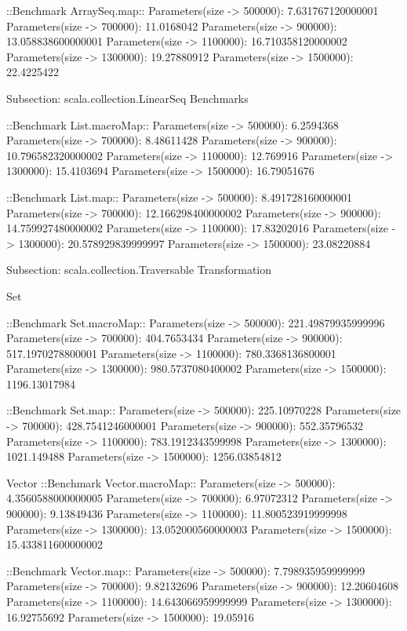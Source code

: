 ::Benchmark ArraySeq.map::
Parameters(size -> 500000): 7.631767120000001
Parameters(size -> 700000): 11.0168042
Parameters(size -> 900000): 13.058838600000001
Parameters(size -> 1100000): 16.710358120000002
Parameters(size -> 1300000): 19.27880912
Parameters(size -> 1500000): 22.4225422


Subsection: scala.collection.LinearSeq Benchmarks

::Benchmark List.macroMap::
Parameters(size -> 500000): 6.2594368
Parameters(size -> 700000): 8.48611428
Parameters(size -> 900000): 10.796582320000002
Parameters(size -> 1100000): 12.769916
Parameters(size -> 1300000): 15.4103694
Parameters(size -> 1500000): 16.79051676

::Benchmark List.map::
Parameters(size -> 500000): 8.491728160000001
Parameters(size -> 700000): 12.166298400000002
Parameters(size -> 900000): 14.759927480000002
Parameters(size -> 1100000): 17.83202016
Parameters(size -> 1300000): 20.578929839999997
Parameters(size -> 1500000): 23.08220884


Subsection: scala.collection.Traversable Transformation

Set

::Benchmark Set.macroMap::
Parameters(size -> 500000): 221.49879935999996
Parameters(size -> 700000): 404.7653434
Parameters(size -> 900000): 517.1970278800001
Parameters(size -> 1100000): 780.3368136800001
Parameters(size -> 1300000): 980.5737080400002
Parameters(size -> 1500000): 1196.13017984

::Benchmark Set.map::
Parameters(size -> 500000): 225.10970228
Parameters(size -> 700000): 428.7541246000001
Parameters(size -> 900000): 552.35796532
Parameters(size -> 1100000): 783.1912343599998
Parameters(size -> 1300000): 1021.149488
Parameters(size -> 1500000): 1256.03854812


Vector
::Benchmark Vector.macroMap::
Parameters(size -> 500000): 4.3560588000000005
Parameters(size -> 700000): 6.97072312
Parameters(size -> 900000): 9.13849436
Parameters(size -> 1100000): 11.800523919999998
Parameters(size -> 1300000): 13.052000560000003
Parameters(size -> 1500000): 15.433811600000002

::Benchmark Vector.map::
Parameters(size -> 500000): 7.798935959999999
Parameters(size -> 700000): 9.82132696
Parameters(size -> 900000): 12.20604608
Parameters(size -> 1100000): 14.643066959999999
Parameters(size -> 1300000): 16.92755692
Parameters(size -> 1500000): 19.05916

